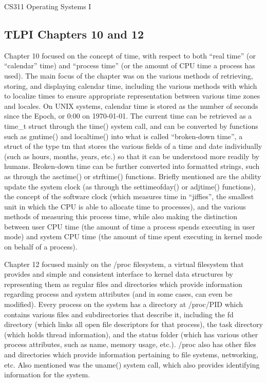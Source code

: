 \documentclass[letterpaper,10pt,fleqn]{article}
\numberwithin{equation}{section}
\begin{document}



{\Large CS311 Operating Systems I}

\subsection*{TLPI Chapters 10 and 12}

Chapter 10 focused on the concept of time, with respect to both ``real time'' (or ``calendar'' time) and ``process time'' (or the amount of CPU time a process has used).  The main focus of the chapter was on the various methods of retrieving, storing, and displaying calendar time, including the various methods with which to localize times to ensure appropriate representation between various time zones and locales.  On UNIX systems, calendar time is stored as the number of seconds since the Epoch, or 0:00 on 1970-01-01.  The current time can be retrieved as a time\_t struct through the time() system call, and can be converted by functions such as gmtime() and localtime() into what is called ``broken-down time'', a struct of the type tm that stores the various fields of a time and date individually (such as hours, months, years, etc.) so that it can be understood more readily by humans.  Broken-down time can be further converted into formatted strings, such as through the asctime() or strftime() functions.  Briefly mentioned are the ability update the system clock (as through the settimeofday() or adjtime() functions), the concept of the software clock (which measures time in ``jiffies'', the smallest unit in which the CPU is able to allocate time to processes), and the various methods of measuring this process time, while also making the distinction between user CPU time (the amount of time a process spends executing in user mode) and system CPU time (the amount of time spent executing in kernel mode on behalf of a process).

Chapter 12 focused mainly on the /proc filesystem, a virtual filesystem that provides and simple and consistent interface to kernel data structures by representing them as regular files and directories which provide information regarding process and system attributes (and in some cases, can even be modified).  Every process on the system has a directory at /proc/PID which contains various files and subdirectories that describe it, including the fd directory (which links all open file descriptors for that process), the task directory (which holds thread information), and the status folder (which has various other process attributes, such as name, memory usage, etc.).  /proc also has other files and directories which provide information pertaining to file systems, networking, etc.  Also mentioned was the uname() system call, which also provides identifying information for the system.
\end{document}
